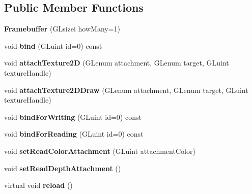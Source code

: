 \subsection*{Public Member Functions}
\begin{DoxyCompactItemize}
\item 
\hypertarget{classfillwave_1_1core_1_1Framebuffer_a3f1dae680d984445933e058f87d555a5}{}{\bfseries Framebuffer} (G\+Lsizei how\+Many=1)\label{classfillwave_1_1core_1_1Framebuffer_a3f1dae680d984445933e058f87d555a5}

\item 
\hypertarget{classfillwave_1_1core_1_1Framebuffer_a286eb0ba19be0c10bde38abbc84e879c}{}void {\bfseries bind} (G\+Luint id=0) const \label{classfillwave_1_1core_1_1Framebuffer_a286eb0ba19be0c10bde38abbc84e879c}

\item 
\hypertarget{classfillwave_1_1core_1_1Framebuffer_a79034e3c1b7aee0df170fa066e89ffca}{}void {\bfseries attach\+Texture2\+D} (G\+Lenum attachment, G\+Lenum target, G\+Luint texture\+Handle)\label{classfillwave_1_1core_1_1Framebuffer_a79034e3c1b7aee0df170fa066e89ffca}

\item 
\hypertarget{classfillwave_1_1core_1_1Framebuffer_a79289cfb07a09dfaa05081591fee7660}{}void {\bfseries attach\+Texture2\+D\+Draw} (G\+Lenum attachment, G\+Lenum target, G\+Luint texture\+Handle)\label{classfillwave_1_1core_1_1Framebuffer_a79289cfb07a09dfaa05081591fee7660}

\item 
\hypertarget{classfillwave_1_1core_1_1Framebuffer_a5003cfbba50a81d0f790898b52623157}{}void {\bfseries bind\+For\+Writing} (G\+Luint id=0) const \label{classfillwave_1_1core_1_1Framebuffer_a5003cfbba50a81d0f790898b52623157}

\item 
\hypertarget{classfillwave_1_1core_1_1Framebuffer_a4493a9b9784a616c76cbe25119f69217}{}void {\bfseries bind\+For\+Reading} (G\+Luint id=0) const \label{classfillwave_1_1core_1_1Framebuffer_a4493a9b9784a616c76cbe25119f69217}

\item 
\hypertarget{classfillwave_1_1core_1_1Framebuffer_a26da0dddb7ae7fcfd2fe180243c29e87}{}void {\bfseries set\+Read\+Color\+Attachment} (G\+Luint attachment\+Color)\label{classfillwave_1_1core_1_1Framebuffer_a26da0dddb7ae7fcfd2fe180243c29e87}

\item 
\hypertarget{classfillwave_1_1core_1_1Framebuffer_ac7bcb86cec3e06263447b3fdf38c8300}{}void {\bfseries set\+Read\+Depth\+Attachment} ()\label{classfillwave_1_1core_1_1Framebuffer_ac7bcb86cec3e06263447b3fdf38c8300}

\item 
\hypertarget{classfillwave_1_1core_1_1Framebuffer_a3cb3180efee34beb841f2b1a4065d3e7}{}virtual void {\bfseries reload} ()\label{classfillwave_1_1core_1_1Framebuffer_a3cb3180efee34beb841f2b1a4065d3e7}

\end{DoxyCompactItemize}

